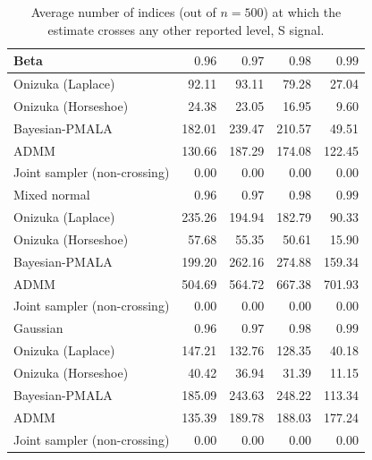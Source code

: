 \begin{table}[!htbp]
\centering
\small
\caption{Average number of indices (out of $n=500$) at which the estimate crosses any other reported level, S signal.}
\label{tab:ext_s_crossings_all}
\begin{tabular}{lrrrr}
\toprule
Beta & $0.96$ & $0.97$ & $0.98$ & $0.99$ \\
\midrule
Onizuka (Laplace) & 92.11 & 93.11 & 79.28 & 27.04 \\
Onizuka (Horseshoe) & 24.38 & 23.05 & 16.95 & 9.60 \\
Bayesian-PMALA & 182.01 & 239.47 & 210.57 & 49.51 \\
ADMM & 130.66 & 187.29 & 174.08 & 122.45 \\
Joint sampler (non-crossing) & 0.00 & 0.00 & 0.00 & 0.00 \\
\midrule
Mixed normal & $0.96$ & $0.97$ & $0.98$ & $0.99$ \\
\midrule
Onizuka (Laplace) & 235.26 & 194.94 & 182.79 & 90.33 \\
Onizuka (Horseshoe) & 57.68 & 55.35 & 50.61 & 15.90 \\
Bayesian-PMALA & 199.20 & 262.16 & 274.88 & 159.34 \\
ADMM & 504.69 & 564.72 & 667.38 & 701.93 \\
Joint sampler (non-crossing) & 0.00 & 0.00 & 0.00 & 0.00 \\
\midrule
Gaussian & $0.96$ & $0.97$ & $0.98$ & $0.99$ \\
\midrule
Onizuka (Laplace) & 147.21 & 132.76 & 128.35 & 40.18 \\
Onizuka (Horseshoe) & 40.42 & 36.94 & 31.39 & 11.15 \\
Bayesian-PMALA & 185.09 & 243.63 & 248.22 & 113.34 \\
ADMM & 135.39 & 189.78 & 188.03 & 177.24 \\
Joint sampler (non-crossing) & 0.00 & 0.00 & 0.00 & 0.00 \\
\bottomrule
\end{tabular}
\end{table}
